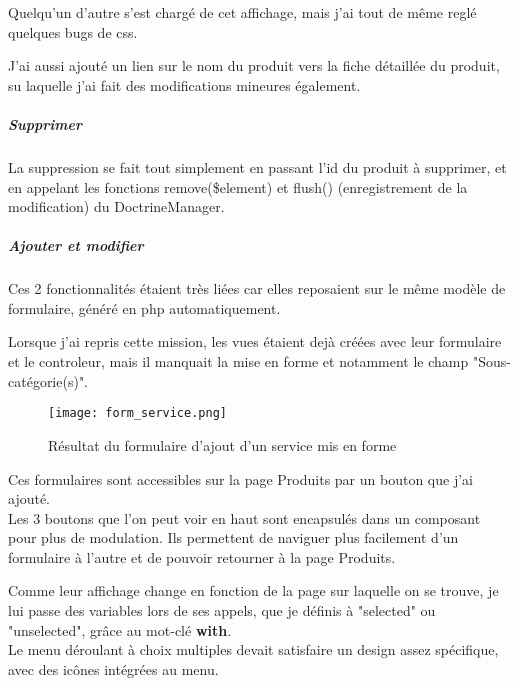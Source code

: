 Quelqu'un d'autre s'est chargé de cet affichage, mais j'ai tout de même reglé quelques bugs de css.

J'ai aussi ajouté un lien sur le nom du produit vers la fiche détaillée du produit, su laquelle j'ai fait des modifications mineures également.

\subparagraph*{Supprimer}


La suppression se fait tout simplement en passant l'id du produit à supprimer, et en appelant les fonctions remove(\$element) et flush() (enregistrement de la modification) du DoctrineManager.

\subparagraph*{Ajouter et modifier}


Ces 2 fonctionnalités étaient très liées car elles reposaient sur le même modèle de formulaire, généré en php automatiquement.

Lorsque j'ai repris cette mission, les vues étaient dejà créées avec leur formulaire et le controleur, mais il manquait la mise en forme et notamment le champ "Sous-catégorie(s)".

\begin{figure}[H]
    \texttt{[image: form\_service.png]}
    \caption{Résultat du formulaire d'ajout d'un service mis en forme}
\end{figure}

Ces formulaires sont accessibles sur la page Produits par un bouton que j'ai ajouté.\\

Les 3 boutons que l'on peut voir en haut sont encapsulés dans un composant pour plus de modulation.
Ils permettent de naviguer plus facilement d'un formulaire à l'autre et de pouvoir retourner à la page Produits.

Comme leur affichage change en fonction de la page sur laquelle on se trouve, je lui passe des variables lors de ses appels, que je définis à "selected" ou "unselected", grâce au mot-clé \textbf{with}.\\

Le menu déroulant à choix multiples devait satisfaire un design assez spécifique, avec des icônes intégrées au menu.

